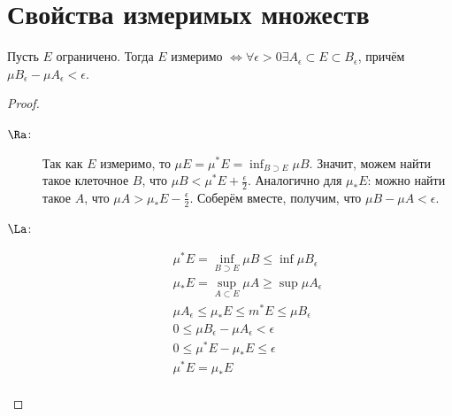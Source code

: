\section{Свойства измеримых множеств}
\begin{theorem}
	Пусть $E$ ограничено.
	Тогда $E$ измеримо $\iff \forall \epsilon > 0 \exists A_\epsilon \subset E \subset B_\epsilon$, причём
	$\mu B_\epsilon - \mu A_\epsilon < \epsilon$.
\end{theorem}
\begin{proof}
	\begin{description}
	\item[$\Ra$:]
		Так как $E$ измеримо, то $\mu E = \mu^* E = \inf_{B \supset E} \mu B$.
		Значит, можем найти такое клеточное $B$, что $\mu B < \mu^*E + \frac{\epsilon}2$.
		Аналогично для $\mu_* E$: можно найти такое $A$, что $\mu A > \mu_*E - \frac{\epsilon}2$.
		Соберём вместе, получим, что $\mu B - \mu A < \epsilon$.
	\item[$\La$:]
		\begin{gather*}
			\mu^*E = \inf_{B\supset E} \mu B \le \inf \mu B_\epsilon \\
			\mu_*E = \sup_{A\subset E} \mu A \ge \sup \mu A_\epsilon \\
			\mu A_\epsilon \le \mu_*E \le m^* E \le \mu B_\epsilon \\
			0 \le \mu B_\epsilon - \mu A_\epsilon < \epsilon \\
			0 \le \mu^* E - \mu_* E \le \epsilon \\
			\mu^* E = \mu_* E \\
		\end{gather*}
	\end{description}
\end{proof}
